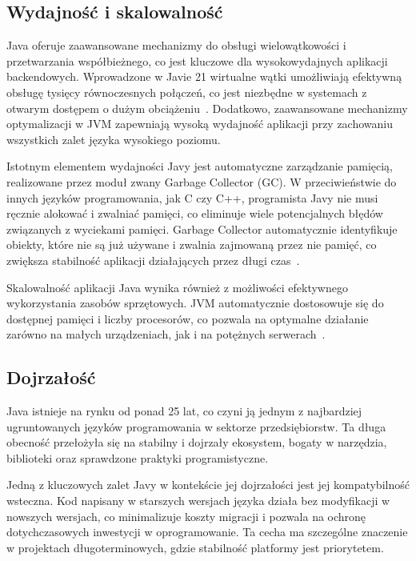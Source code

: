 \documentclass[a4paper,12pt,openany]{book}
\begin{document}
\subsection*{Wydajność i skalowalność}

Java oferuje zaawansowane mechanizmy do obsługi wielowątkowości i przetwarzania współbieżnego, co jest kluczowe dla wysokowydajnych aplikacji backendowych. Wprowadzone w Javie 21 wirtualne wątki umożliwiają efektywną obsługę tysięcy równoczesnych połączeń, co jest niezbędne w systemach z otwarym dostępem o dużym obciążeniu~\cite{bib:oracle2023virtual}. Dodatkowo, zaawansowane mechanizmy optymalizacji w JVM zapewniają wysoką wydajność aplikacji przy zachowaniu wszystkich zalet języka wysokiego poziomu.

Istotnym elementem wydajności Javy jest automatyczne zarządzanie pamięcią, realizowane przez moduł zwany Garbage Collector (GC). W przeciwieństwie do innych języków programowania, jak C czy C++, programista Javy nie musi ręcznie alokować i zwalniać pamięci, co eliminuje wiele potencjalnych błędów związanych z wyciekami pamięci. Garbage Collector automatycznie identyfikuje obiekty, które nie są już używane i zwalnia zajmowaną przez nie pamięć, co zwiększa stabilność aplikacji działających przez długi czas~\cite{bib:oracle2023gc}.

Skalowalność aplikacji Java wynika również z możliwości efektywnego wykorzystania zasobów sprzętowych. JVM automatycznie dostosowuje się do dostępnej pamięci i liczby procesorów, co pozwala na optymalne działanie zarówno na małych urządzeniach, jak i na potężnych serwerach~\cite{bib:boringowl2023jvm}.

\subsection*{Dojrzałość}

Java istnieje na rynku od ponad 25 lat, co czyni ją jednym z najbardziej ugruntowanych języków programowania w sektorze przedsiębiorstw. Ta długa obecność przełożyła się na stabilny i dojrzały ekosystem, bogaty w narzędzia, biblioteki oraz sprawdzone praktyki programistyczne.

Jedną z kluczowych zalet Javy w kontekście jej dojrzałości jest jej kompatybilność wsteczna. Kod napisany w starszych wersjach języka działa bez modyfikacji w nowszych wersjach, co minimalizuje koszty migracji i pozwala na ochronę dotychczasowych inwestycji w oprogramowanie. Ta cecha ma szczególne znaczenie w projektach długoterminowych, gdzie stabilność platformy jest priorytetem.
\end{document}
